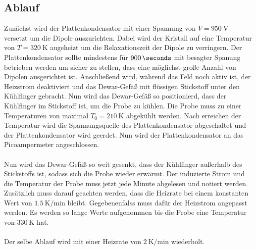 \subsection{Ablauf}
Zunächst wird der Plattenkondensator mit einer Spannung von $V = \SI{950}{\V}$ versetzt um die Dipole auszurichten.
Dabei wird der Kristall auf eine Temperatur von $T = \SI{320}{\K}$ augeheizt um die Relaxationszeit der Dipole zu verringern.
Der Plattenkondensator sollte mindestens für $900\,\si{\seconds}$ mit besagter Spanung betrieben werden um sicher zu stellen, dass eine möglichst große Anzahl von Dipolen ausgerichtet ist.
Anschließend wird, während das Feld noch aktiv ist, der Heizstrom deaktiviert und das Dewar-Gefäß mit flüssigen Stickstoff unter den Kühlfinger gebracht.
Nun wird das Dewar-Gefäß so positionierd, dass der Kühlfinger im Stickstoff ist, um die Probe zu kühlen.
Die Probe muss zu einer Temperaturen von maximal $T_0 = \SI{210}{\K}$ abgekühlt werden.
Nach erreichen der Temperatur wird die Spannungsquelle des Plattenkondensator abgeschaltet und der Plattenkondensator wird geerdet.
Nun wird der Plattenkondensator an das Picoampermeter angeschlossen.
\\\\
Nun wird das Dewar-Gefäß so weit gesenkt, dass der Kühlfinger außerhalb des Stickstoffs ist, sodass sich die Probe wieder erwärmt.
Der induzierte Strom und die Temperatur der Probe muss jetzt jede Minute abgelesen und notiert werden.
Zusätzlich muss darauf geachten werden, dass die Heizrate bei einem konstanten Wert von $\SI{1.5}{\K \per \minute}$ bleibt.
Gegebenenfalss muss dafür der Heizstrom angepasst werden.
Es werden so lange Werte aufgenommen bis die Probe eine Temperatur von $\SI{330}{\K}$ hat.
\\\\
Der selbe Ablauf wird mit einer Heizrate von $\SI{2}{\K \per \minute}$ wiederholt.
